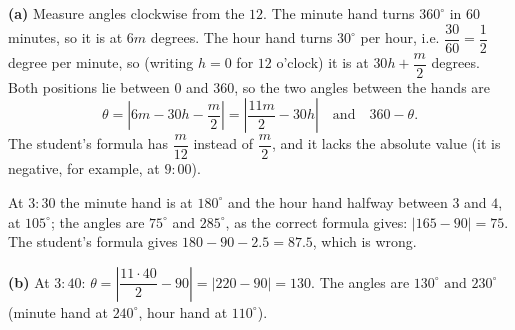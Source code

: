 \textbf{(a)} Measure angles clockwise from the $12$. The minute hand turns $360^\circ$ in $60$ minutes, so it is at $6m$ degrees. The hour hand turns $30^\circ$ per hour, i.e. $\dfrac{30}{60}=\dfrac12$ degree per minute, so (writing $h=0$ for $12$ o'clock) it is at $30h+\dfrac m2$ degrees. Both positions lie between $0$ and $360$, so the two angles between the hands are
\[\theta=\left|6m-30h-\dfrac m2\right|=\left|\dfrac{11m}{2}-30h\right|\quad\text{and}\quad360-\theta.\]
The student's formula has $\dfrac m{12}$ instead of $\dfrac m2$, and it lacks the absolute value (it is negative, for example, at $9{:}00$).

At $3{:}30$ the minute hand is at $180^\circ$ and the hour hand halfway between $3$ and $4$, at $105^\circ$; the angles are $75^\circ$ and $285^\circ$, as the correct formula gives: $\left|165-90\right|=75$. The student's formula gives $180-90-2.5=87.5$, which is wrong.

\textbf{(b)} At $3{:}40$: $\theta=\left|\dfrac{11\cdot40}{2}-90\right|=|220-90|=130$. The angles are $\boxed{130^\circ\text{ and }230^\circ}$ (minute hand at $240^\circ$, hour hand at $110^\circ$).
